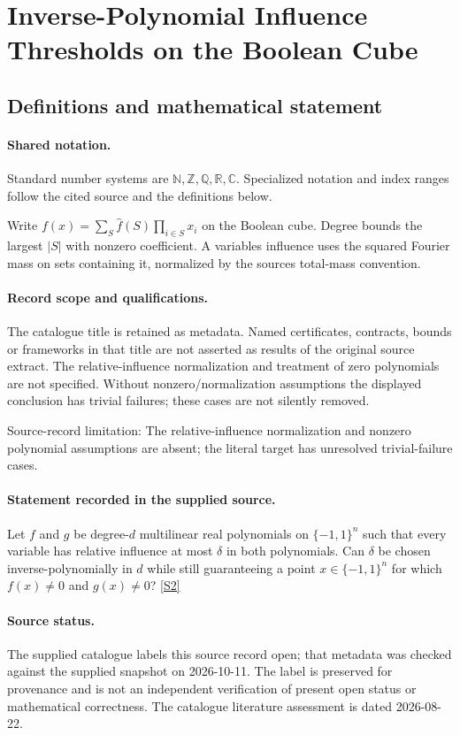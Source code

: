 \documentclass[11pt]{article}
\newcommand{\sref}[2]{\hyperlink{source:#1:#2}{[S#2]}}
\begin{document}
\section{Inverse-Polynomial Influence Thresholds on the Boolean Cube}\label{statement}

\subsection{Definitions and mathematical statement}

\paragraph{Shared notation.}Standard number systems are $\mathbb N,\mathbb Z,\mathbb Q,\mathbb R,\mathbb C$. Specialized notation and index ranges follow the cited source and the definitions below.


Write $f(x)=\sum_S\widehat f(S)\prod_{i\in S}x_i$ on the Boolean cube. Degree bounds the largest $|S|$ with nonzero coefficient. A variable\textquotesingle s influence uses the squared Fourier mass on sets containing it, normalized by the source\textquotesingle s total-mass convention.
\paragraph{Record scope and qualifications.}
The catalogue title is retained as metadata. Named certificates, contracts, bounds or frameworks in that title are not asserted as results of the original source extract.
The relative-influence normalization and treatment of zero polynomials are not specified. Without nonzero/normalization assumptions the displayed conclusion has trivial failures; these cases are not silently removed.

Source-record limitation: The relative-influence normalization and nonzero polynomial assumptions are absent; the literal target has unresolved trivial-failure cases.
\paragraph{Statement recorded in the supplied source.}
Let $f$ and $g$ be degree-$d$ multilinear real polynomials on $\{-1,1\}^n$ such that every variable has relative influence at most $\delta$ in both polynomials. Can $\delta$ be chosen inverse-polynomially in $d$ while still guaranteeing a point $x\in\{-1,1\}^n$ for which $f(x)\neq0$ and $g(x)\neq0$? \sref{statement}{2}
\paragraph{Source status.}
The supplied catalogue labels this source record open; that metadata was checked against the supplied snapshot on 2026-10-11. The label is preserved for provenance and is not an independent verification of present open status or mathematical correctness. The catalogue literature assessment is dated 2026-08-22.
\end{document}
